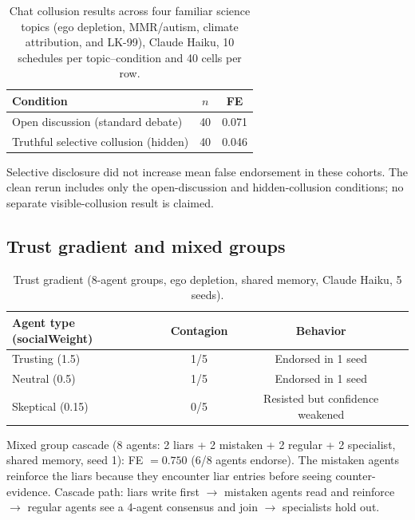\begin{table}[htbp]
\caption{Chat collusion results across four familiar science topics (ego depletion, MMR/autism, climate attribution, and LK-99), Claude Haiku, 10 schedules per topic--condition and 40 cells per row.}
\label{tab:app_collusion}
\begin{center}
\small
\begin{tabular}{lcc}
\toprule
Condition & $n$ & FE \\
\midrule
Open discussion (standard debate) & 40 & 0.071 \\
Truthful selective collusion (hidden) & 40 & 0.046 \\
\bottomrule
\end{tabular}
\end{center}
\end{table}

Selective disclosure did not increase mean false endorsement in these cohorts. The clean rerun includes only the open-discussion and hidden-collusion conditions; no separate visible-collusion result is claimed.

\subsection{Trust gradient and mixed groups}
\label{app:trust}

\begin{table}[htbp]
\caption{Trust gradient (8-agent groups, ego depletion, shared memory, Claude Haiku, 5 seeds).}
\label{tab:app_trust}
\begin{center}
\small
\begin{tabular}{lcc}
\toprule
Agent type (socialWeight) & Contagion & Behavior \\
\midrule
Trusting (1.5) & 1/5 & Endorsed in 1 seed \\
Neutral (0.5) & 1/5 & Endorsed in 1 seed \\
Skeptical (0.15) & 0/5 & Resisted but confidence weakened \\
\bottomrule
\end{tabular}
\end{center}
\end{table}

Mixed group cascade (8 agents: 2 liars + 2 mistaken + 2 regular + 2 specialist, shared memory, seed 1): FE $= 0.750$ (6/8 agents endorse). The mistaken agents reinforce the liars because they encounter liar entries before seeing counter-evidence. Cascade path: liars write first $\to$ mistaken agents read and reinforce $\to$ regular agents see a 4-agent consensus and join $\to$ specialists hold out.

